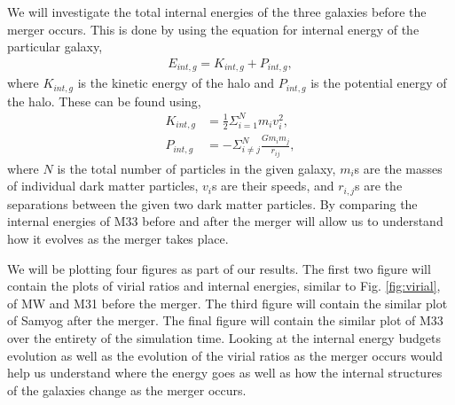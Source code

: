 \documentclass[twocolumn]{aastex631}
\begin{document}
We will investigate the total internal energies of the three galaxies before the merger occurs. This is done by using the equation for internal energy of the particular galaxy,
\begin{align}
    E_{int,g} = K_{int,g} + P_{int,g},
    \label{eq:internal_energy}
\end{align}
where $K_{int,g}$ is the kinetic energy of the halo and $P_{int,g}$ is the potential energy of the halo. These can be found using,
\begin{align}
    K_{int,g} &=\frac{1}{2}\Sigma_{i=1}^N m_i v_i^2, \nonumber \\ 
    P_{int,g} &= - \Sigma_{i\neq j}^{N} \frac{G m_i m_j}{r_{ij}},
    \label{eq:kinetic_and_potential_energy}
\end{align}
where $N$ is the total number of particles in the given galaxy, $m_i$s are the masses of individual dark matter particles, $v_i$s are their speeds, and $r_{i,j}$s are the separations between the given two dark matter particles. By comparing the internal energies of M33 before and after the merger will allow us to understand how it evolves as the merger takes place.

We will be plotting four figures as part of our results. The first two figure will contain the plots of virial ratios and internal energies, similar to Fig. \ref{fig:virial}, of MW and M31 before the merger. The third figure will contain the similar plot of Samyog after the merger. The final figure will contain the similar plot of M33 over the entirety of the simulation time. Looking at the internal energy budgets evolution as well as the evolution of the virial ratios as the merger occurs would help us understand where the energy goes as well as how the internal structures of the galaxies change as the merger occurs.
\end{document}
